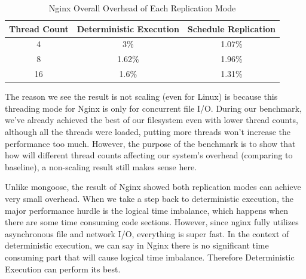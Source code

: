 \begin{table}
\caption{Nginx Overall Overhead of Each Replication Mode}
\begin{center}
 \begin{tabular}{c | c | c}
Thread Count & Deterministic Execution & Schedule Replication \\ \hline
 4 & 3\% & 1.07\% \\ \hline
 8 & 1.62\% & 1.96\% \\ \hline
 16 & 1.6\% & 1.31\% \\ \hline
 \end{tabular}
\end{center}
\label{t:nginx_overall}
\end{table}

The reason we see the result is not scaling (even for Linux) is because this threading mode for Nginx is only for concurrent file I/O. During our benchmark, we've already achieved the best of our filesystem even with lower thread counts, although all the threads were loaded, putting more threads won't increase the performance too much. However, the purpose of the benchmark is to show that how will different thread counts affecting our system's overhead (comparing to baseline), a non-scaling result still makes sense here.

Unlike mongoose, the result of Nginx showed both replication modes can achieve very small overhead. When we take a step back to deterministic execution, the major performance hurdle is the logical time imbalance, which happens when there are some time consuming code sections. However, since nginx fully utilizes asynchronous file and network I/O, everything is super fast. In the context of deterministic execution, we can say in Nginx there is no significant time consuming part that will cause logical time imbalance. Therefore Deterministic Execution can perform its best.


